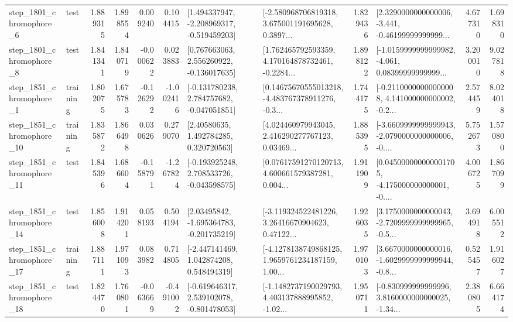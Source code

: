 \begin{tabular}{llrrrrllrlrr}
  step\_1801\_chromophore\_6 &      test &      1.889315 &    1.898554 &      0.009240 &  0.104415 &   [1.494337947, -2.208969317, -0.519459203] &  [-2.580968706819318, 3.675001191695628, 0.3897... &       1.829436 &  [2.3290000000000006, -3.441, -0.46199999999999... &            4.677310 &          1.698310 \\
  step\_1801\_chromophore\_8 &      test &      1.841341 &    1.840719 &     -0.000622 &  0.023883 &    [0.767663063, 2.556260922, -0.136017635] &  [1.762465792593359, 4.170164878732461, -0.2284... &       1.898122 &  [-1.0159999999999982, -4.061, 0.08399999999999... &            3.200010 &          9.027818 \\
  step\_1851\_chromophore\_1 &  training &      1.802075 &    1.675783 &     -0.126292 & -1.002416 &   [-0.131780238, 2.784757682, -0.047051851] &  [0.14675670555013218, -4.483767378911276, -0.3... &       1.744175 &  [-0.21100000000000008, 4.141000000000002, -0.2... &            2.574459 &          8.024018 \\
 step\_1851\_chromophore\_10 &  training &      1.835872 &    1.866498 &      0.030626 &  0.279070 &      [2.40580635, 1.492784285, 0.320720563] &  [4.024460979943045, 2.416290277767123, 0.03469... &       1.885395 &  [-3.6609999999999943, -2.0790000000000006, -0.... &            5.752673 &          1.570800 \\
 step\_1851\_chromophore\_11 &      test &      1.845396 &    1.686604 &     -0.158791 & -1.267824 &   [-0.193925248, 2.708533726, -0.043598575] &  [0.07617591270120713, 4.600661579387281, 0.004... &       1.911909 &  [0.045000000000001705, -4.175000000000001, -0.... &            4.006725 &          1.867099 \\
 step\_1851\_chromophore\_14 &      test &      1.856008 &    1.914201 &      0.058193 &  0.504194 &    [2.03495842, -1.695364783, -0.201735219] &  [-3.119324522481226, 3.26416670904623, 0.47122... &       1.926035 &  [3.1750000000000043, -2.7209999999999965, -0.5... &            3.694918 &          6.005512 \\
 step\_1851\_chromophore\_17 &  training &      1.887111 &    1.971093 &      0.083982 &  0.714805 &    [-2.447141469, 1.042874208, 0.548494319] &  [-4.1278138749868125, 1.9659761234187159, 1.00... &       1.970103 &  [3.6670000000000016, -1.6029999999999944, -0.8... &            0.525457 &          1.916027 \\
 step\_1851\_chromophore\_18 &      test &      1.824470 &    1.760801 &     -0.063669 & -0.491002 &   [-0.619646317, 2.539102078, -0.801478053] &  [-1.1482737190029793, 4.403137888995852, -1.02... &       1.950711 &  [-0.830999999999996, 3.8160000000000025, -1.34... &            2.380805 &          6.664174 \\

\end{tabular}
